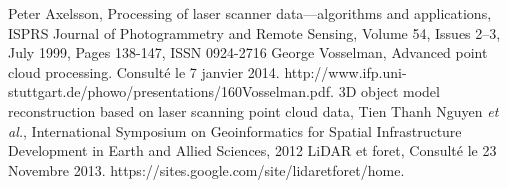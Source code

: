 \begin{thebibliography}{99}

 Peter Axelsson, Processing of laser scanner data—algorithms and applications, ISPRS Journal of Photogrammetry and Remote Sensing, Volume 54, Issues 2–3, July 1999, Pages 138-147, ISSN 0924-2716 
 George Vosselman, Advanced point cloud processing. Consulté le 7 janvier 2014. http://www.ifp.uni-stuttgart.de/phowo/presentations/160Vosselman.pdf.
  3D object model reconstruction based on laser scanning point cloud data,
Tien Thanh Nguyen \textit{et al.}, International Symposium on Geoinformatics for Spatial Infrastructure Development in Earth and Allied Sciences, 2012
 LiDAR et foret, Consulté le 23 Novembre 2013. https://sites.google.com/site/lidaretforet/home.
\end{thebibliography}
